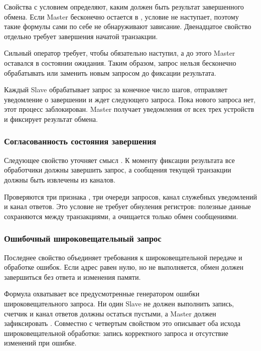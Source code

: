 Свойства с условием  определяют, каким должен быть
результат завершенного обмена. Если Master бесконечно остается
в , условие  не наступает,
поэтому такие формулы сами по себе не обнаруживают зависание.
Двенадцатое свойство отдельно требует завершения начатой транзакции.


Сильный оператор  требует, чтобы  обязательно
наступил, а до этого Master оставался в состоянии ожидания. Таким образом,
запрос нельзя бесконечно обрабатывать или заменить новым запросом
до фиксации результата.

Каждый Slave обрабатывает запрос за конечное число шагов, отправляет
уведомление о завершении и ждет следующего запроса. Пока нового запроса
нет, этот процесс заблокирован. Master получает уведомления от всех
трех устройств и фиксирует результат обмена.

\subsubsection{Согласованность состояния завершения}

Следующее свойство уточняет смысл . К моменту фиксации
результата все обработчики должны завершить запрос, а сообщения текущей
транзакции должны быть извлечены из каналов.


Проверяются три признака , три очереди запросов,
канал служебных уведомлений и канал ответов. Это условие не требует
обнуления регистров: полезные данные сохраняются между транзакциями,
а очищается только обмен сообщениями.

\subsubsection{Ошибочный широковещательный запрос}

Последнее свойство объединяет требования к широковещательной передаче
и обработке ошибок. Если адрес равен нулю, но 
не выполняется, обмен должен завершиться без ответа и изменения памяти.


Формула охватывает все предусмотренные генератором ошибки широковещательного
запроса. Ни один Slave не должен выполнить запись, счетчик и канал ответов
должны остаться пустыми, а Master должен зафиксировать
. Совместно с четвертым свойством это описывает
оба исхода широковещательной обработки: запись корректного запроса
и отсутствие изменений при ошибке.
